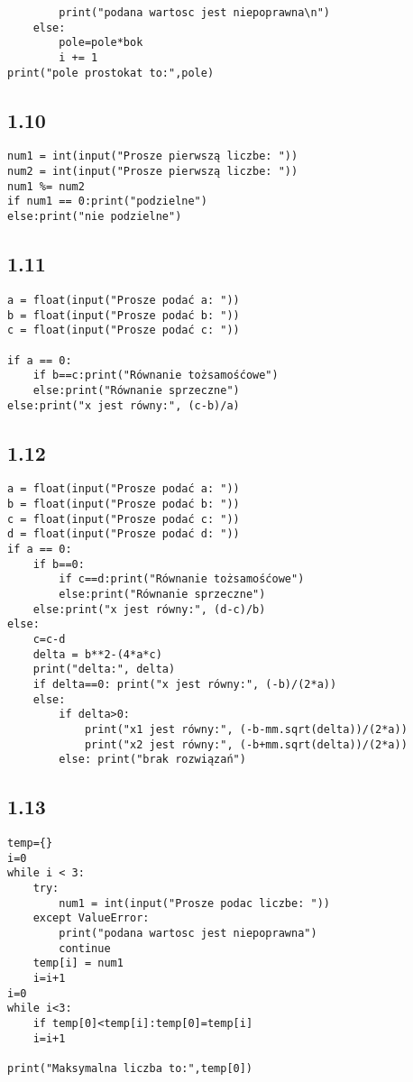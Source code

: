 \documentclass[a4paper,11pt]{article}
\begin{document}
\begin{multicols}{2}
\begin{flushright}
\begin{verbatim}
        print("podana wartosc jest niepoprawna\n")
    else:
        pole=pole*bok
        i += 1
print("pole prostokat to:",pole)
\end{verbatim}
\subsection*{1.10}
\begin{verbatim}
num1 = int(input("Prosze pierwszą liczbe: "))
num2 = int(input("Prosze pierwszą liczbe: "))
num1 %= num2 
if num1 == 0:print("podzielne")
else:print("nie podzielne")
\end{verbatim}
\end{flushright}
\pagebreak
\subsection*{1.11}
\begin{verbatim}
a = float(input("Prosze podać a: "))
b = float(input("Prosze podać b: "))
c = float(input("Prosze podać c: ")) 

if a == 0:
    if b==c:print("Równanie tożsamośćowe") 
    else:print("Równanie sprzeczne")    
else:print("x jest równy:", (c-b)/a)
\end{verbatim}
\subsection*{1.12}
\begin{minipage}{3cm}
\begin{verbatim}
a = float(input("Prosze podać a: "))
b = float(input("Prosze podać b: "))
c = float(input("Prosze podać c: "))
d = float(input("Prosze podać d: ")) 
if a == 0:
    if b==0:
        if c==d:print("Równanie tożsamośćowe") 
        else:print("Równanie sprzeczne")    
    else:print("x jest równy:", (d-c)/b)
else:
    c=c-d
    delta = b**2-(4*a*c)
    print("delta:", delta)
    if delta==0: print("x jest równy:", (-b)/(2*a))
    else:
        if delta>0:
            print("x1 jest równy:", (-b-mm.sqrt(delta))/(2*a))
            print("x2 jest równy:", (-b+mm.sqrt(delta))/(2*a))
        else: print("brak rozwiązań")
\end{verbatim}
\end{minipage}
\subsection*{1.13}
\begin{verbatim}
temp={}
i=0
while i < 3:
    try:
        num1 = int(input("Prosze podac liczbe: "))
    except ValueError:
        print("podana wartosc jest niepoprawna")
        continue
    temp[i] = num1
    i=i+1
i=0
while i<3:
    if temp[0]<temp[i]:temp[0]=temp[i]
    i=i+1

print("Maksymalna liczba to:",temp[0])
\end{verbatim}
\vspace{3cm}
\end{multicols}
\end{document}
